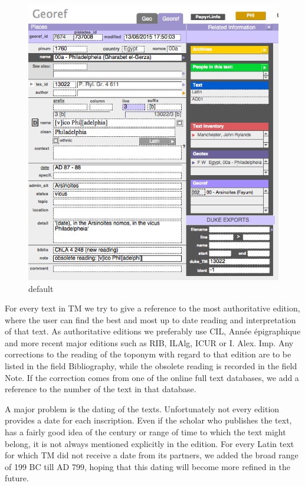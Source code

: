 \documentclass[amsthm,ebook]{saparticle}
\begin{document}
\begin{figure}[!bp]
\centering
 \includegraphics[width=\columnwidth]{EAGLE2016FullPaperVerreth-img003.png}
\caption{default}
\label{fig:3}
\end{figure}
 

For every text in TM we try to give a reference to the most authoritative edition, where the user can find the best
and most up to date reading and interpretation of that text. As authoritative editions we preferably use CIL, Année
épigraphique and more recent major editions such as RIB, ILAlg, ICUR or I. Alex. Imp. Any corrections to the reading of
the toponym with regard to that edition are to be listed in the field Bibliography, while the obsolete reading is
recorded in the field Note. If the correction comes from one of the online full text databases, we add a reference to
the number of the text in that database.

A major problem is the dating of the texts. Unfortunately not every edition provides a date for each inscription.
Even if the scholar who publishes the text, has a fairly good idea of the century or range of time to which the text
might belong, it is not always mentioned explicitly in the edition. For every Latin text for which TM did not receive a
date from its partners, we added the broad range of 199 BC till AD 799, hoping that this dating will become more
refined in the future.
\end{document}
